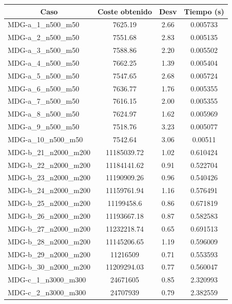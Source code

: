 \documentclass[11pt,a4paper]{article}
\begin{document}
\begin{table}[H]
	\begin{center}
			\begin{tabular}{|l|c|c|c|} 
			\hline
			\multicolumn{1}{|c|}{\textbf{Caso}} & \textbf{Coste obtenido} & \textbf{Desv} & \textbf{Tiempo (s)} \\ \hline
	
			MDG-a\_1\_n500\_m50 & 7625.19 & 2.66 & 0.005733 \\ \hline
			MDG-a\_2\_n500\_m50 & 7551.68 & 2.83 & 0.005135 \\ \hline
			MDG-a\_3\_n500\_m50 & 7588.86 & 2.20 & 0.005502 \\ \hline
			MDG-a\_4\_n500\_m50 & 7662.25 & 1.39 & 0.005404 \\ \hline
			MDG-a\_5\_n500\_m50 & 7547.65 & 2.68 & 0.005724 \\ \hline
			MDG-a\_6\_n500\_m50 & 7636.77 & 1.76 & 0.005355 \\ \hline
			MDG-a\_7\_n500\_m50 & 7616.15 & 2.00 & 0.005355 \\ \hline
			MDG-a\_8\_n500\_m50 & 7624.97 & 1.62 & 0.005969 \\ \hline
			MDG-a\_9\_n500\_m50 & 7518.76 & 3.23 & 0.005077 \\ \hline
			MDG-a\_10\_n500\_m50 & 7542.64 & 3.06 & 0.00511 \\ \hline
			MDG-b\_21\_n2000\_m200 & 11185039.72 & 1.02 & 0.610424 \\ \hline
			MDG-b\_22\_n2000\_m200 & 11184141.62 & 0.91 & 0.522704 \\ \hline
			MDG-b\_23\_n2000\_m200 & 11190909.26 & 0.96 & 0.540426 \\ \hline
			MDG-b\_24\_n2000\_m200 & 11159761.94 & 1.16 & 0.576491 \\ \hline
			MDG-b\_25\_n2000\_m200 & 11199458.6 & 0.86 & 0.671819 \\ \hline
			MDG-b\_26\_n2000\_m200 & 11193667.18 & 0.87 & 0.582583 \\ \hline
			MDG-b\_27\_n2000\_m200 & 11232218.74 & 0.65 & 0.691513 \\ \hline
			MDG-b\_28\_n2000\_m200 & 11145206.65 & 1.19 & 0.596009 \\ \hline
			MDG-b\_29\_n2000\_m200 & 11216509 & 0.71 & 0.553593 \\ \hline
			MDG-b\_30\_n2000\_m200 & 11209294.03 & 0.77 & 0.560047 \\ \hline
			MDG-c\_1\_n3000\_m300 & 24671605 & 0.85 & 2.320993 \\ \hline
			MDG-c\_2\_n3000\_m300 & 24707939 & 0.79 & 2.382559 \\ \hline

\end{tabular}
\end{center}
\end{table}
\end{document}
